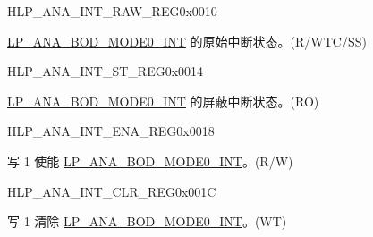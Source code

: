 \begin{register}{H}{LP\_ANA\_INT\_RAW\_REG}{0x0010}\label{regdesc:LPANAINTRAWREG}
%
%
\regnewline%
\begin{regdesc}\begin{reglist}
\label{fielddesc:LPANABODMODE0INTRAW}\item [LP\_ANA\_BOD\_MODE0\_INT\_RAW] \hyperref[int:LPANABODMODE0INT]{LP\_ANA\_BOD\_MODE0\_INT} 的原始中断状态。(R/WTC/SS)
\end{reglist}\end{regdesc}
\end{register}

\begin{register}{H}{LP\_ANA\_INT\_ST\_REG}{0x0014}\label{regdesc:LPANAINTSTREG}
%
%
\regnewline%
\begin{regdesc}\begin{reglist}
\label{fielddesc:LPANABODMODE0INTST}\item [LP\_ANA\_BOD\_MODE0\_INT\_ST] \hyperref[int:LPANABODMODE0INT]{LP\_ANA\_BOD\_MODE0\_INT} 的屏蔽中断状态。(RO)
\end{reglist}\end{regdesc}
\end{register}

\begin{register}{H}{LP\_ANA\_INT\_ENA\_REG}{0x0018}\label{regdesc:LPANAINTENAREG}
%
%
\regnewline%
\begin{regdesc}\begin{reglist}
\label{fielddesc:LPANABODMODE0INTENA}\item [LP\_ANA\_BOD\_MODE0\_INT\_ENA] 写 1 使能 \hyperref[int:LPANABODMODE0INT]{LP\_ANA\_BOD\_MODE0\_INT}。(R/W)
\end{reglist}\end{regdesc}
\end{register}

\begin{register}{H}{LP\_ANA\_INT\_CLR\_REG}{0x001C}\label{regdesc:LPANAINTCLRREG}
%
%
\regnewline%
\begin{regdesc}\begin{reglist}
\label{fielddesc:LPANABODMODE0INTCLR}\item [LP\_ANA\_BOD\_MODE0\_INT\_CLR] 写 1 清除 \hyperref[int:LPANABODMODE0INT]{LP\_ANA\_BOD\_MODE0\_INT}。(WT)
\end{reglist}\end{regdesc}
\end{register}


